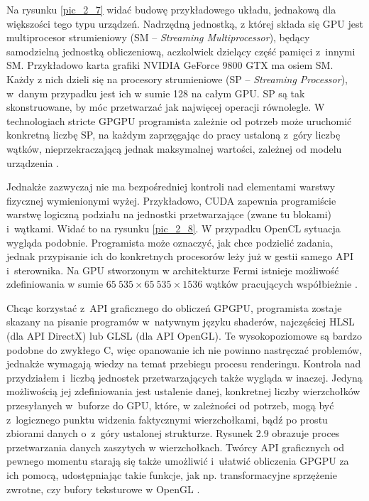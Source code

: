 		Na rysunku \ref{pic_2_7} widać budowę przykładowego układu, jednakową dla większości tego typu urządzeń. Nadrzędną jednostką, z której składa się GPU jest multiprocesor strumieniowy (SM -- \emph{Streaming Multiprocessor}), będący samodzielną jednostką obliczeniową, aczkolwiek dzielący część pamięci z~innymi SM. Przykładowo karta grafiki NVIDIA GeForce 9800 GTX ma osiem SM. Każdy z nich dzieli się na procesory strumieniowe (SP -- \emph{Streaming Processor}), w~danym przypadku jest ich w sumie 128 na całym GPU. SP są tak skonstruowane, by móc przetwarzać jak najwięcej operacji równolegle. W technologiach stricte GPGPU programista zależnie od potrzeb może uruchomić konkretną liczbę SP, na każdym zaprzęgając do pracy ustaloną z~góry liczbę wątków, nieprzekraczającą jednak maksymalnej wartości, zależnej od modelu urządzenia \cite{cuda}.
		
		
		Jednakże zazwyczaj nie ma bezpośredniej kontroli nad elementami warstwy fizycznej wymienionymi wyżej. Przykładowo, CUDA zapewnia programiście warstwę logiczną podziału na jednostki przetwarzające (zwane tu blokami) i~wątkami. Widać to na rysunku \ref{pic_2_8}. W przypadku OpenCL sytuacja wygląda podobnie. Programista może oznaczyć, jak chce podzielić zadania, jednak przypisanie ich do konkretnych procesorów leży już w gestii samego API i~sterownika. Na GPU stworzonym w architekturze Fermi istnieje możliwość zdefiniowania w sumie \(65\ 535 \times 65\ 535 \times 1536\) wątków pracujących współbieżnie \cite{cuda}.\newpage
		
		
		Chcąc korzystać z~API graficznego do obliczeń GPGPU, programista zostaje skazany na pisanie programów w~natywnym języku shaderów, najczęściej HLSL (dla API DirectX) lub GLSL (dla API OpenGL). Te wysokopoziomowe są bardzo podobne do zwykłego C, więc opanowanie ich nie powinno nastręczać problemów, jednakże wymagają wiedzy na temat przebiegu procesu renderingu. Kontrola nad przydziałem i~liczbą jednostek przetwarzających także wygląda w inaczej. Jedyną możliwością jej zdefiniowania jest ustalenie danej, konkretnej liczby wierzchołków przesyłanych w~buforze do GPU, które, w zależności od potrzeb, mogą być z~logicznego punktu widzenia faktycznymi wierzchołkami, bądź po prostu zbiorami danych o~z~góry ustalonej strukturze. Rysunek 2.9 obrazuje proces przetwarzania danych zaszytych w wierzchołkach. Twórcy API graficznych od pewnego momentu starają się także umożliwić i~ułatwić obliczenia GPGPU za ich pomocą, udostępniając takie funkcje, jak np. transformacyjne sprzężenie zwrotne, czy bufory teksturowe w OpenGL \cite{receptury}. \newpage
		
